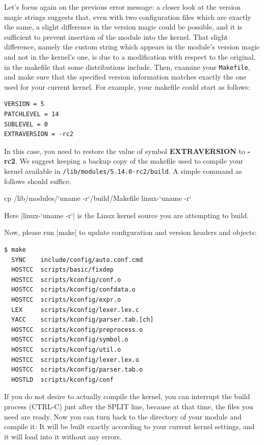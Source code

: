 \documentclass[10pt, oneside]{book}
\begin{document}
Let's focus again on the previous error message: a closer look at the version magic strings suggests that, even with two configuration files which are exactly the same, a slight difference in the version magic could be possible, and it is sufficient to prevent insertion of the module into the kernel.
That slight difference, namely the custom string which appears in the module's version magic and not in the kernel's one, is due to a modification with respect to the original, in the makefile that some distributions include.
Then, examine your \verb|Makefile|, and make sure that the specified version information matches exactly the one used for your current kernel.
For example, your makefile could start as follows:

\begin{verbatim}
VERSION = 5
PATCHLEVEL = 14
SUBLEVEL = 0
EXTRAVERSION = -rc2
\end{verbatim}

In this case, you need to restore the value of symbol \textbf{EXTRAVERSION} to \textbf{-rc2}.
We suggest keeping a backup copy of the makefile used to compile your kernel available in \verb|/lib/modules/5.14.0-rc2/build|.
A simple command as follows should suffice.
\begin{codebash}
cp /lib/modules/`uname -r`/build/Makefile linux-`uname -r`
\end{codebash}
Here \sh|linux-`uname -r`| is the Linux kernel source you are attempting to build.

Now, please run \sh|make| to update configuration and version headers and objects:

\begin{verbatim}
$ make
  SYNC    include/config/auto.conf.cmd
  HOSTCC  scripts/basic/fixdep
  HOSTCC  scripts/kconfig/conf.o
  HOSTCC  scripts/kconfig/confdata.o
  HOSTCC  scripts/kconfig/expr.o
  LEX     scripts/kconfig/lexer.lex.c
  YACC    scripts/kconfig/parser.tab.[ch]
  HOSTCC  scripts/kconfig/preprocess.o
  HOSTCC  scripts/kconfig/symbol.o
  HOSTCC  scripts/kconfig/util.o
  HOSTCC  scripts/kconfig/lexer.lex.o
  HOSTCC  scripts/kconfig/parser.tab.o
  HOSTLD  scripts/kconfig/conf
\end{verbatim}

If you do not desire to actually compile the kernel, you can interrupt the build process (CTRL-C) just after the SPLIT line, because at that time, the files you need are ready.
Now you can turn back to the directory of your module and compile it: It will be built exactly according to your current kernel settings, and it will load into it without any errors.
\end{document}
